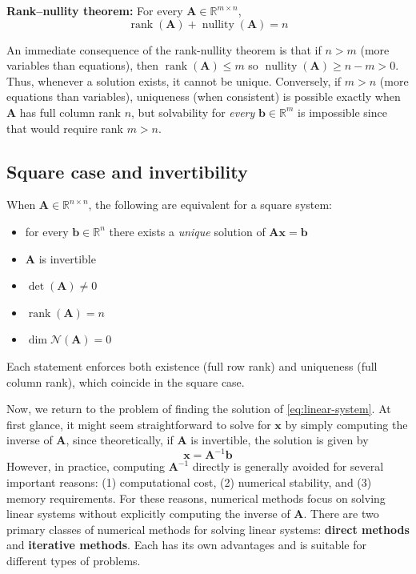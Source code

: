 \begin{theoremBox}
\textbf{Rank--nullity theorem:}
For every $\mathbf{A}\in\mathbb{R}^{m\times n}$,
\[
\operatorname{rank}(\mathbf{A})+\operatorname{nullity}(\mathbf{A})=n
\]
\end{theoremBox}
An immediate consequence of the rank-nullity theorem is that if $n>m$ (more variables than equations), then $\operatorname{rank}(\mathbf{A})\le m$ so $\operatorname{nullity}(\mathbf{A})\ge n-m>0$. Thus, whenever a solution exists, it cannot be unique. Conversely, if $m>n$ (more equations than variables), uniqueness (when consistent) is possible exactly when $\mathbf{A}$ has full column rank $n$, but solvability for \emph{every} $\mathbf{b}\in\mathbb{R}^m$ is impossible since that would require rank $m>n$.

\subsection{Square case and invertibility} When $\mathbf{A}\in\mathbb{R}^{n\times n}$, the following are equivalent for a square system:
\begin{itemize}
    \item for every $\mathbf{b}\in\mathbb{R}^n$ there exists a \emph{unique} solution of $\mathbf{A}\mathbf{x}=\mathbf{b}$
    \item $\mathbf{A}$ is invertible
    \item $\det(\mathbf{A})\neq 0$
    \item $\operatorname{rank}(\mathbf{A})=n$
    \item $\dim\mathcal{N}(\mathbf{A})=0$
\end{itemize}
Each statement enforces both existence (full row rank) and uniqueness (full column rank), which coincide in the square case.

Now, we return to the problem of finding the solution of \autoref{eq:linear-system}. At first glance, it might seem straightforward to solve for $ \mathbf{x} $ by simply computing the inverse of $ \mathbf{A} $, since theoretically, if $ \mathbf{A} $ is invertible, the solution is given by
\begin{equation*}
    \mathbf{x} = \mathbf{A}^{-1}\mathbf{b}
\end{equation*}
However, in practice, computing $ \mathbf{A}^{-1} $ directly is generally avoided for several important reasons: (1) computational cost, (2) numerical stability, and (3) memory requirements. For these reasons, numerical methods focus on solving linear systems without explicitly computing the inverse of $ \mathbf{A} $. There are two primary classes of numerical methods for solving linear systems: \textbf{direct methods} and \textbf{iterative methods}. Each has its own advantages and is suitable for different types of problems.


